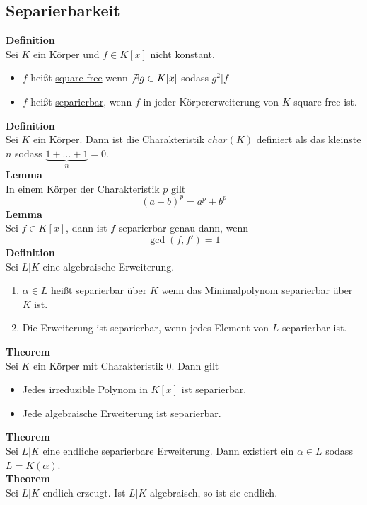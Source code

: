 \documentclass[a4paper, 12pt]{article}
\begin{document}
\subsection{Separierbarkeit}
\textbf{Definition}\\
Sei $K$ ein Körper und $f \in K[x]$ nicht konstant. \begin{itemize}
	\item $f$ heißt \underline{square-free} wenn $\not \exists g \in K[x]$ sodass $g^2 | f$
	\item $f$ heißt \underline{separierbar}, wenn $f$ in jeder Körpererweiterung von $K$ square-free ist. 
\end{itemize}
\textbf{Definition}\\
Sei $K$ ein Körper. Dann ist die Charakteristik $char(K)$ definiert als das kleinste $n$ sodass $\underbrace{1+...+1}_{n} = 0$.\\
\textbf{Lemma}\\
In einem Körper der Charakteristik $p$ gilt \[(a+b)^p = a^p + b^p\]
\textbf{Lemma}\\
Sei $f \in K[x]$, dann ist $f$ separierbar genau dann, wenn \[\gcd(f,f') = 1\]
\textbf{Definition}\\
Sei $L|K$ eine algebraische Erweiterung. \begin{enumerate}
	\item $\alpha \in L$ heißt separierbar über $K$ wenn das Minimalpolynom separierbar über $K$ ist.
	\item Die Erweiterung ist separierbar, wenn jedes Element von $L$ separierbar ist.
\end{enumerate}
\textbf{Theorem}\\
Sei $K$ ein Körper mit Charakteristik 0. Dann gilt \begin{itemize}
	\item Jedes irreduzible Polynom in $K[x]$ ist separierbar.
	\item Jede algebraische Erweiterung ist separierbar.
\end{itemize}
\textbf{Theorem}\\
Sei $L|K$ eine endliche separierbare Erweiterung. Dann existiert ein $\alpha \in L$ sodass $L = K(\alpha)$.\\
\textbf{Theorem}\\
Sei $L|K$ endlich erzeugt. Ist $L|K$ algebraisch, so ist sie endlich.
\end{document}
